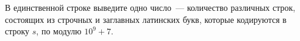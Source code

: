 В единственной строке выведите одно число~--- количество различных строк, состоящих из строчных и заглавных латинских букв, которые кодируются в строку $s$, по модулю $10^9 + 7$.